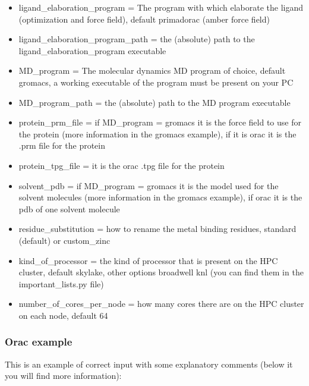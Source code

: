 \begin{itemize}
				\item ligand\_elaboration\_program = The program with which elaborate the ligand (optimization and force field), default primadorac (amber force field)
				
				\item ligand\_elaboration\_program\_path = the (absolute) path to the ligand\_elaboration\_program executable

				
				\item MD\_program = The molecular dynamics MD program of choice, default gromacs, a working executable of the program must be present on your PC
				
				\item MD\_program\_path = the (absolute) path to the MD program executable
				
				\item protein\_prm\_file = if MD\_program = gromacs it is the force field to use for the protein (more information in the gromacs example), if it is orac it is the .prm file for the protein
				
				\item protein\_tpg\_file = it is the orac .tpg file for the protein
				
				\item solvent\_pdb = if MD\_program = gromacs it is the model used for the solvent molecules (more information in the gromacs example), if orac it is the pdb of one solvent molecule

				\item residue\_substitution = how to rename the metal binding residues, standard (default) or custom\_zinc\cite{zinc_substitutions}
				
				\item kind\_of\_processor = the kind of processor that is present on the HPC cluster, default skylake, other options broadwell knl (you can find them in the important\_lists.py file)
				
				\item number\_of\_cores\_per\_node = how many cores there are on the HPC cluster on each node, default 64
				
			\end{itemize}
	
				\subsubsection*{Orac example}
				
					This is an example of correct input with some explanatory comments (below it you will find more information):
				
